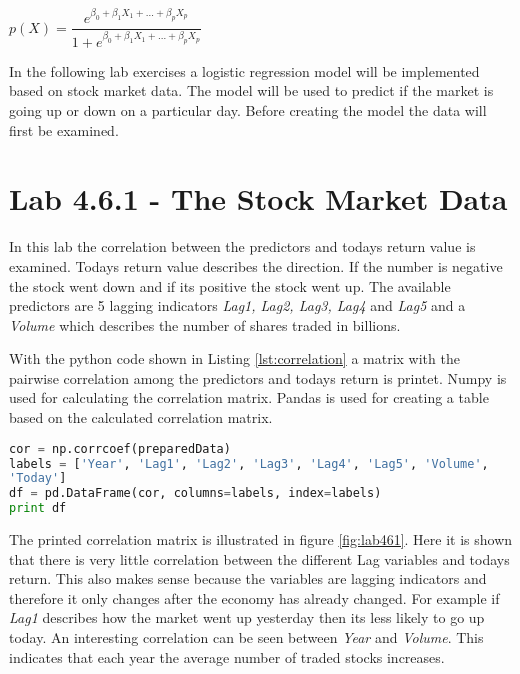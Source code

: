 \begin{center}
	$p(X) = \dfrac{e^{\beta_0 + \beta_1 X_1 + ... + \beta_p X_p}}{1 + e^{\beta_0 + \beta_1 X_1 + ... + \beta_p X_p}}$ 
\end{center}



In the following lab exercises a logistic regression model will be implemented based on stock market data. The model will be used to predict if the market is going up or down on a particular day. Before creating the model the data will first be examined.

\section{Lab 4.6.1 - The Stock Market Data}
In this lab the correlation between the predictors and todays return value is examined. Todays return value describes the direction. If the number is negative the stock went down and if its positive the stock went up. The available predictors are 5 lagging indicators \emph{Lag1, Lag2, Lag3, Lag4} and \emph{Lag5} and a \emph{Volume} which describes the number of shares traded in billions.

With the python code shown in Listing \ref{lst:correlation} a matrix with the pairwise correlation among the predictors and todays return is printet. Numpy is used for calculating the correlation matrix. Pandas is used for creating a table based on the calculated correlation matrix.
\begin{lstlisting}[language=Python, label=lst:correlation, caption=Print correlation matrix]
cor = np.corrcoef(preparedData)
labels = ['Year', 'Lag1', 'Lag2', 'Lag3', 'Lag4', 'Lag5', 'Volume', 
'Today']
df = pd.DataFrame(cor, columns=labels, index=labels)
print df
\end{lstlisting}

The printed correlation matrix is illustrated in figure \ref{fig:lab461}. Here it is shown that there is very little correlation between the different Lag variables and todays return. This also makes sense because the variables are lagging indicators and therefore it only changes after the economy has already changed. For example if \emph{Lag1} describes how the market went up yesterday then its less likely to go up today. An interesting correlation can be seen between \emph{Year} and \emph{Volume}. This indicates that each year the average number of traded stocks increases. 

